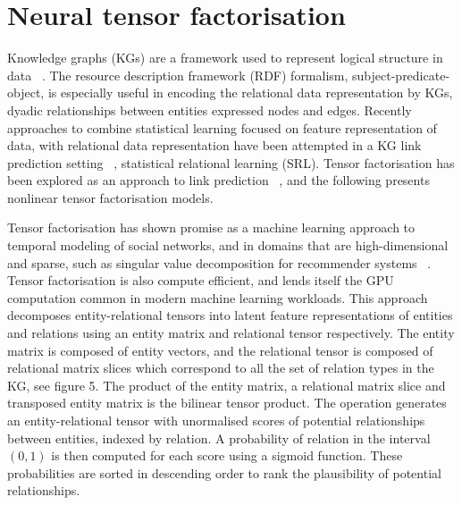 \chapter{Neural tensor factorisation}


\ifpdf
     \graphicspath{{Figs/Chapter3/}}
\else
    \graphicspath{{Chapter3/Figs/Vector/}{Chapter3/Figs/}}
\fi

Knowledge graphs (KGs) are a framework used to represent logical structure in data \unskip ~\citep{koller2007introduction}. The resource description framework (RDF) formalism, subject-predicate-object, is especially useful in encoding the relational data representation by KGs, dyadic relationships between entities expressed nodes and edges. Recently approaches to combine statistical learning focused on feature representation of data, with relational data representation have been attempted in a KG link prediction setting \unskip~\citep{kazemi2018simple, chang2014typed, kang2012gigatensor}, statistical relational learning (SRL). Tensor factorisation has been explored as an approach to link prediction \unskip ~\citep{nickel2011three, bordes2013translating, trouillon2016complex}, and the following presents nonlinear tensor factorisation models. \par

\noindent Tensor factorisation has shown promise as a machine learning approach to temporal modeling of social networks, and in domains that are high-dimensional and sparse, such as singular value decomposition for recommender systems \unskip ~\citep{koren2009matrix}. Tensor factorisation is also compute efficient, and lends itself the GPU computation common in modern machine learning workloads. This approach decomposes entity-relational tensors into latent feature representations of entities and relations using an entity matrix and relational tensor respectively. The entity matrix is composed of entity vectors, and the relational tensor is composed of relational matrix slices which correspond to all the set of relation types in the KG, see figure 5. The product of the entity matrix, a relational matrix slice and transposed entity matrix is the bilinear tensor product. The operation generates an entity-relational tensor with unormalised scores of potential relationships between entities, indexed by relation. A probability of relation in the interval $ (0, 1) $ is then computed for each score using a sigmoid function. These probabilities are sorted in descending order to rank the plausibility of potential relationships. 


